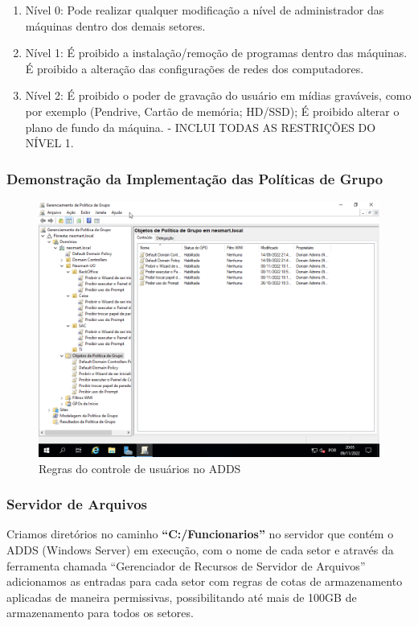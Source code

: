\documentclass[12pt]{article}
\begin{document}
\begin{enumerate}
    \item Nível 0: Pode realizar qualquer modificação a nível de administrador das máquinas dentro dos demais setores.
    \item Nível 1: É proibido a instalação/remoção de programas dentro das máquinas. É proibido a alteração das configurações de redes dos computadores.
    \item Nível 2: É proibido o poder de gravação do usuário em mídias graváveis, como por exemplo (Pendrive, Cartão de memória; HD/SSD); É proibido alterar o plano de fundo da máquina. - INCLUI TODAS AS RESTRIÇÕES DO NÍVEL 1.
\end{enumerate}

\subsubsection{Demonstração da Implementação das Políticas de Grupo}

\begin{figure}[ht]
\centering
\includegraphics[height=0.5\textwidth]{adds-regras.png}
\caption{Regras do controle de usuários no ADDS}
\label{fig:adds-pastas}
\end{figure}

\subsubsection{Servidor de Arquivos}
Criamos diretórios no caminho \textbf{“C:/Funcionarios”} no servidor que contém o ADDS (Windows Server) em execução, com o nome de cada setor e através da ferramenta chamada “Gerenciador de Recursos de Servidor de Arquivos” adicionamos as entradas para cada setor com regras de cotas de armazenamento aplicadas de maneira permissivas, possibilitando até mais de 100GB de armazenamento para todos os setores.
\end{document}
